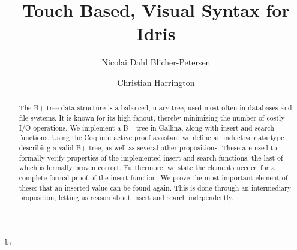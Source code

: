 \documentclass[oribibl]{llncs}
\begin{document}
\mainmatter
\title{Touch Based, Visual Syntax for Idris}
\author{Nicolai Dahl Blicher-Petersen \and Christian Harrington \\
}

\maketitle

\begin{abstract}
The B+ tree data structure is a balanced, n-ary tree, used most often in databases and file systems. It is known for its high fanout, thereby minimizing the number of costly I/O operations. We implement a B+ tree in Gallina, along with insert and search functions. Using the Coq interactive proof assistant we define an inductive data type describing a valid B+ tree, as well as several other propositions. These are used to formally verify properties of the implemented insert and search functions, the last of which is formally proven correct. Furthermore, we state the elements needed for a complete formal proof of the insert function. We prove the most important element of these: that an inserted value can be found again. This is done through an intermediary proposition, letting us reason about insert and search independently.

\end{abstract}
la

\newpage

\end{document}
